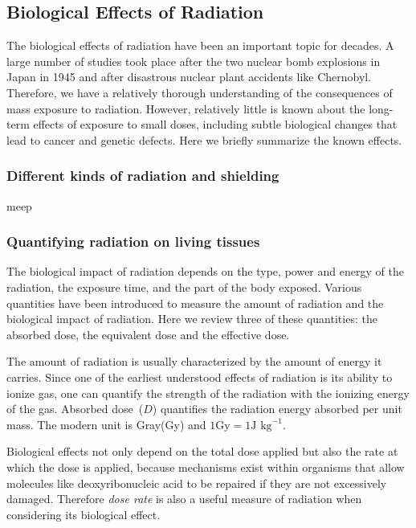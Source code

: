 \documentclass[preprint,aip,pra]{revtex4-1}
\begin{document}
    \subsection{Biological Effects of Radiation}
        The biological effects of radiation have been an important topic for decades. A large
        number of studies took place after the two nuclear bomb explosions in Japan in 1945
        and after disastrous nuclear plant accidents like Chernobyl. Therefore, we have a relatively
        thorough understanding of the consequences of mass exposure to radiation. However, relatively
        little is known about the long-term effects of exposure to small doses, including subtle biological
        changes that lead to cancer and genetic defects. Here we briefly summarize the known effects.
        \subsubsection{Different kinds of radiation and shielding}
        meep
        \subsubsection{Quantifying radiation on living tissues}
        The biological impact of radiation depends on the type, power and energy of the radiation, the
        exposure time, and the part of the body exposed. Various quantities have been introduced to
        measure the amount of radiation and the biological impact of radiation. Here we review three
        of these quantities: the absorbed dose, the equivalent dose and the effective dose.

        The amount of radiation is usually characterized by the amount of energy it carries. Since one of
        the earliest understood effects of radiation is its ability to ionize gas, one can quantify the
        strength of the radiation with the ionizing energy of the gas.
        Absorbed dose~($D$) quantifies the 
        radiation energy absorbed per unit mass. The modern unit is Gray(Gy)
        and $1\text{Gy}=1\text{J kg}^{-1}$.\cite{u16}

        Biological effects not only depend on the total dose applied but also the rate at which the 
        dose is applied, because mechanisms exist within organisms that allow molecules like deoxyribonucleic acid
        to be repaired if they are not excessively damaged. Therefore {\it dose rate} is also a useful
        measure of radiation when considering its biological effect.
\end{document}

